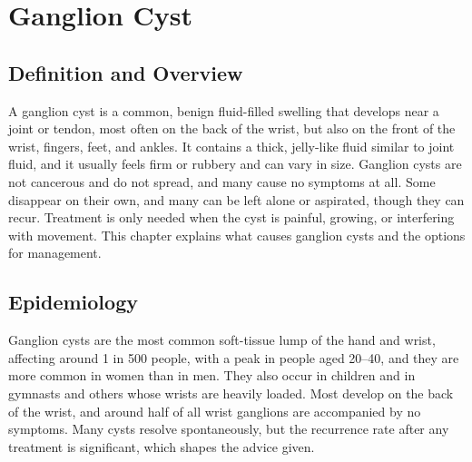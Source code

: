 \chapter{Ganglion Cyst}

\section*{Definition and Overview}
A ganglion cyst is a common, benign fluid-filled swelling that develops near a joint or tendon, most often on the back of the wrist, but also on the front of the wrist, fingers, feet, and ankles. It contains a thick, jelly-like fluid similar to joint fluid, and it usually feels firm or rubbery and can vary in size. Ganglion cysts are not cancerous and do not spread, and many cause no symptoms at all. Some disappear on their own, and many can be left alone or aspirated, though they can recur. Treatment is only needed when the cyst is painful, growing, or interfering with movement. This chapter explains what causes ganglion cysts and the options for management.

\section*{Epidemiology}
Ganglion cysts are the most common soft-tissue lump of the hand and wrist, affecting around 1 in 500 people, with a peak in people aged 20--40, and they are more common in women than in men. They also occur in children and in gymnasts and others whose wrists are heavily loaded. Most develop on the back of the wrist, and around half of all wrist ganglions are accompanied by no symptoms. Many cysts resolve spontaneously, but the recurrence rate after any treatment is significant, which shapes the advice given.

